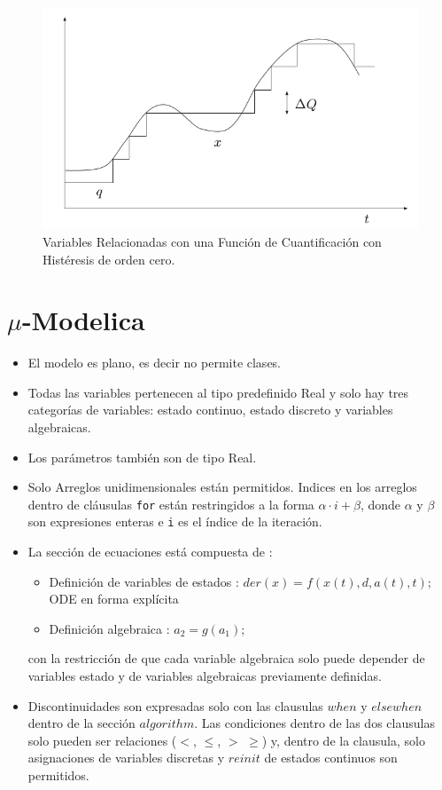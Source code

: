 \documentclass{beamer}
\begin{document}
\begin{frame}
	\begin{figure}[H]
	  \includegraphics[scale=0.5]{histeresis1}
	  \caption{Variables Relacionadas con una Función de Cuantificación con Histéresis de orden cero.} \label{fig:fig2-2}
	\end{figure}
\end{frame}


\section{$\mu$-Modelica}
\begin{frame}
	\begin{itemize}
	 \item El modelo es plano, es decir no permite clases.
	 \item Todas las variables pertenecen al tipo predefinido Real y solo hay tres categorías de variables: estado continuo, estado discreto y variables 
	algebraicas.
	 \item Los parámetros también son de tipo Real. 
	 \item 
     
    Solo Arreglos unidimensionales están permitidos. Indices en los arreglos dentro de cláusulas \texttt{for} están restringidos a la forma $\alpha \cdot i + \beta$, 
	donde $\alpha$ y $\beta$ son expresiones enteras e \texttt{i} es el índice de la iteración.
	 \item La sección de ecuaciones está compuesta de :
	 \begin{itemize}
		\item Definición de variables de estados : $der(x) =  f (x(t), d, a(t), t);$ ODE en forma explícita
		\item Definición algebraica : $a_2  = g(a_1);$
	 \end{itemize}
	 con la restricción de que cada variable algebraica solo puede depender de variables estado y de variables algebraicas previamente definidas.
	 
	 \item Discontinuidades son expresadas solo con las clausulas $when$ y $elsewhen$ dentro de la sección $algorithm$. Las condiciones dentro de las dos 
	clausulas solo pueden ser relaciones ($<$, $\leqslant$, $>$ $\geqslant$) y, dentro de la clausula, solo asignaciones de variables discretas y $reinit$ 
	de estados continuos son permitidos.
	\end{itemize}
\end{frame}
\end{document}
